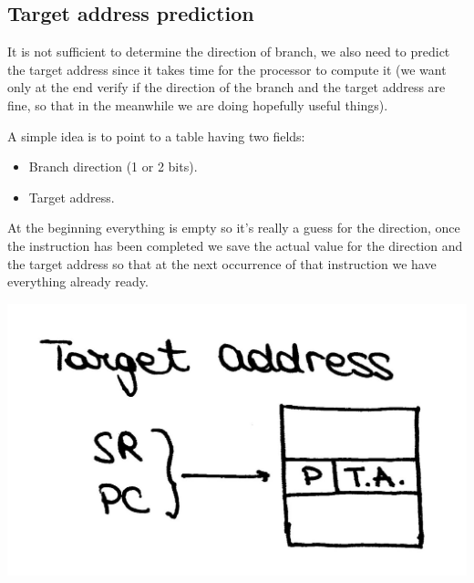 \subsection{Target address prediction}
It is not sufficient to determine the direction of branch, we also need to
predict the target address since it takes time for the processor to compute
it (we want only at the end verify if the direction of the branch and the
target address are fine, so that in the meanwhile we are doing hopefully useful
things).

A simple idea is to point to a table having two fields:
\begin{itemize}
  \item Branch direction (1 or 2 bits).
  \item Target address.
\end{itemize}

At the beginning everything is empty so it's really a guess for the direction,
once the instruction has been completed we save the actual value for the
direction and the target address so that at the next occurrence of that
instruction we have everything already ready.
\begin{center}
  \includegraphics[width=0.5\linewidth]{img/img3/25}
\end{center}

